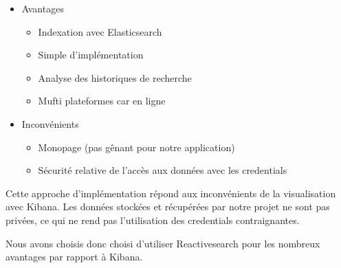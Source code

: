 \newpage
\begin{itemize}
    \item Avantages 
        \begin{itemize}
            \item Indexation avec Elasticsearch
	    \item Simple d'implémentation
	    \item Analyse des historiques de recherche
	    \item Mufti plateformes car en ligne
        \end{itemize}
    \item Inconvénients 
        \begin{itemize}
	    \item Monopage (pas gênant pour notre application)
	    \item Sécurité relative de l’accès aux données avec les credentials
        \end{itemize}
\end{itemize}

Cette approche d’implémentation répond aux inconvénients de la visualisation avec Kibana.
Les données stockées et récupérées par notre projet ne sont pas privées, ce qui ne rend pas l'utilisation des credentials contraignantes.

Nous avons choisis donc choisi d'utiliser Reactivesearch pour les nombreux avantages par rapport à Kibana. 



